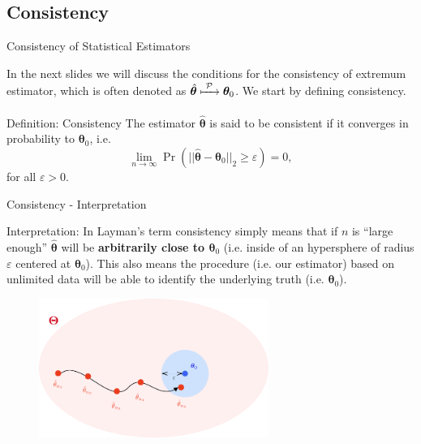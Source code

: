 \documentclass[envcountsect,usenames,dvipsnames]{beamer}
\def\btheta{\bm \theta}
\theoremstyle{mystyle}
\begin{document}
\subsection{Consistency}
\begin{frame}{Consistency of Statistical Estimators}
	
		In the next slides we will discuss the conditions for the consistency of extremum estimator, which is often denoted as $\hat{\btheta} \xmapsto[\;\;\;\;\; ]{\mathcal{P}} \btheta_0$. We start by defining consistency. \vspace{0.5cm}
		
		\begin{alertblock}{Definition: Consistency}
			The estimator $\hat{\btheta}$ is said to be consistent if it converges in probability to $\btheta_0$, i.e.
			\begin{equation*}
				\lim_{n \to \infty} \Pr \left(|| \hat{\btheta} - \btheta_0 ||_2 \geq \varepsilon \right) = 0,
			\end{equation*}
			for all $\varepsilon > 0$. 
		\end{alertblock}
		
\end{frame}

\begin{frame}{Consistency - Interpretation}
	
	\begin{exampleblock}{Interpretation:}
		In Layman's term consistency simply means that if $n$ is ``large enough'' $\hat{\bm{\theta}}$ will be {\color{beamer@myorange}\textbf{arbitrarily close to $\bm{\theta}_0$}} (i.e. inside of an hypersphere of radius $\varepsilon$ centered at $\bm{\theta}_0$). This also means the procedure (i.e. our estimator) based on unlimited data will be able to identify the underlying truth (i.e.  $\bm{\theta}_0$).
	\end{exampleblock}
	
	\vspace{-0.1cm}
	\begin{figure}
	    \centering
	  \includegraphics[width = 7.5cm]{Images/consistency}
	\end{figure}
\end{frame}
\end{document}
